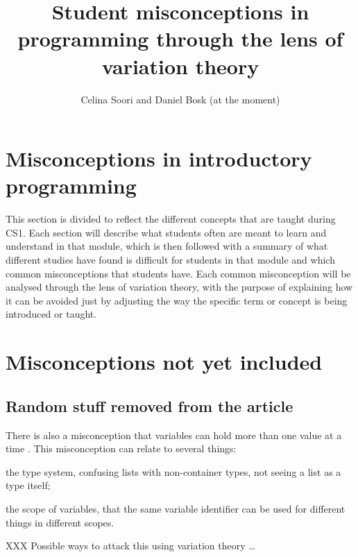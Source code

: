 \documentclass[onecolumn]{article}
\title{Student misconceptions in programming through the lens of variation 
theory}
\author{Celina Soori and Daniel Bosk (at the moment)}
\begin{document}
\maketitle
\newpage
\tableofcontents
\newpage












\section{Misconceptions in introductory programming}
\label{misconceptions}

This section is divided to reflect the different concepts that are taught 
during CS1. Each section will describe what students often are meant to 
learn and understand in that module, which is then followed with a summary 
of what different studies have found is difficult for students in that 
module and which common misconceptions that students have. Each common 
misconception will be analysed through the lens of variation theory, with 
the purpose of explaining how it can be avoided just by adjusting the way 
the specific term or concept is being introduced or taught. 










\newpage
\printbibliography

\newpage

\appendix

\section{Misconceptions not yet included}

\subsection{Random stuff removed from the article}

There is also a misconception that variables can hold more than one value 
at a time \parencite{Doukakis2007}.
This misconception can relate to several things:
\begin{enumerate*}
  \item the type system, confusing lists with non-container types, not 
seeing a 
    list as a type itself;
  \item the scope of variables, that the same variable identifier can be 
used 
    for different things in different scopes.
\end{enumerate*}

XXX Possible ways to attack this using variation theory \dots



\end{document}
